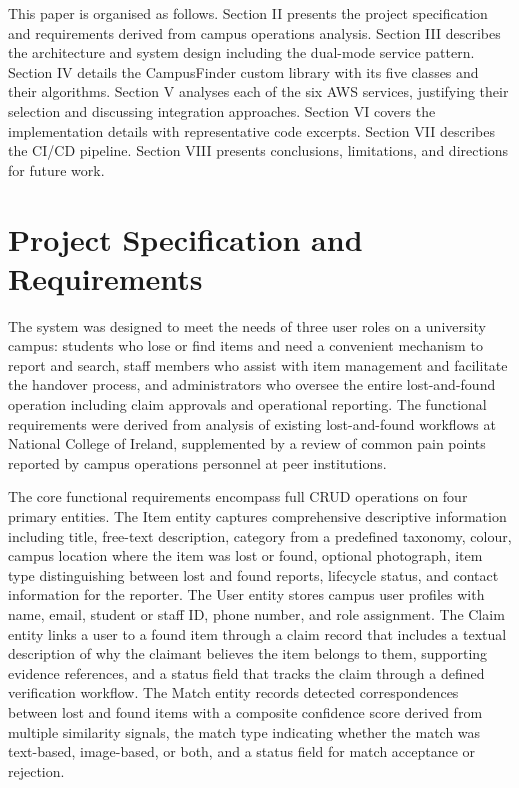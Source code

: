 \documentclass[conference]{IEEEtran}
\begin{document}
This paper is organised as follows. Section II presents the project specification and requirements derived from campus operations analysis. Section III describes the architecture and system design including the dual-mode service pattern. Section IV details the CampusFinder custom library with its five classes and their algorithms. Section V analyses each of the six AWS services, justifying their selection and discussing integration approaches. Section VI covers the implementation details with representative code excerpts. Section VII describes the CI/CD pipeline. Section VIII presents conclusions, limitations, and directions for future work.

\section{Project Specification and Requirements}

The system was designed to meet the needs of three user roles on a university campus: students who lose or find items and need a convenient mechanism to report and search, staff members who assist with item management and facilitate the handover process, and administrators who oversee the entire lost-and-found operation including claim approvals and operational reporting. The functional requirements were derived from analysis of existing lost-and-found workflows at National College of Ireland, supplemented by a review of common pain points reported by campus operations personnel at peer institutions.

The core functional requirements encompass full CRUD operations on four primary entities. The Item entity captures comprehensive descriptive information including title, free-text description, category from a predefined taxonomy, colour, campus location where the item was lost or found, optional photograph, item type distinguishing between lost and found reports, lifecycle status, and contact information for the reporter. The User entity stores campus user profiles with name, email, student or staff ID, phone number, and role assignment. The Claim entity links a user to a found item through a claim record that includes a textual description of why the claimant believes the item belongs to them, supporting evidence references, and a status field that tracks the claim through a defined verification workflow. The Match entity records detected correspondences between lost and found items with a composite confidence score derived from multiple similarity signals, the match type indicating whether the match was text-based, image-based, or both, and a status field for match acceptance or rejection.
\end{document}

